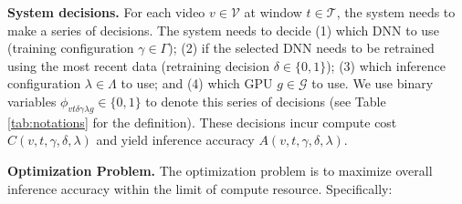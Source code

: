 \noindent\textbf{System decisions.} For each video $v\in\mathcal{V}$ at window $t\in\mathcal{T}$, the system needs to make a series of decisions. The system needs to decide (1) which DNN to use (training configuration $\gamma\in\Gamma$); (2) if the selected DNN needs to be retrained using the most recent data (retraining decision $\delta\in\{0,1\}$); (3) which inference configuration $\lambda\in\Lambda$ to use; and (4) which GPU $g\in\mathcal{G}$ to use. 
We use binary variables $\phi_{vt\delta\gamma\lambda g}\in\{0,1\}$ to denote this series of decisions (see Table \ref{tab:notations} for the definition). 
These decisions incur compute cost $C(v, t, \gamma, \delta, \lambda)$ and yield inference accuracy $A(v, t, \gamma, \delta, \lambda)$.


\noindent\textbf{Optimization Problem.} The optimization problem is to maximize overall inference accuracy within the limit of compute resource. Specifically:

